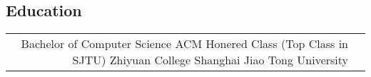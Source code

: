 \documentclass[10pt]{article} %
\begin{document}
\begin{paracol}{2}


\vspace{-\baselineskip}\medskip %


\medskip %







\section{Education} 





\begin{supertabular}{rl} %

	
	{Bachelor of Computer Science } %
	{ACM Honered Class (Top Class in SJTU)} %
	{Zhiyuan College} %
	{Shanghai Jiao Tong University} %
	


\end{supertabular}
\end{paracol}
\end{document}

